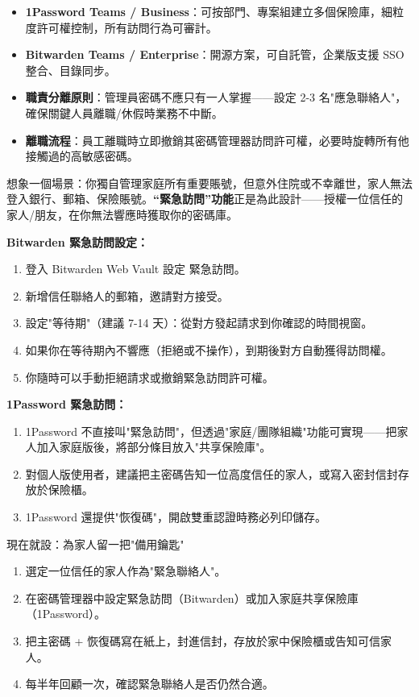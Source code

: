\begin{itemize}
  \item \textbf{1Password Teams / Business}：可按部門、專案組建立多個保險庫，細粒度許可權控制，所有訪問行為可審計。
  \item \textbf{Bitwarden Teams / Enterprise}：開源方案，可自託管，企業版支援 SSO 整合、目錄同步。
  \item \textbf{職責分離原則}：管理員密碼不應只有一人掌握——設定 2-3 名"應急聯絡人"，確保關鍵人員離職/休假時業務不中斷。
  \item \textbf{離職流程}：員工離職時立即撤銷其密碼管理器訪問許可權，必要時旋轉所有他接觸過的高敏感密碼。
\end{itemize}


想象一個場景：你獨自管理家庭所有重要賬號，但意外住院或不幸離世，家人無法登入銀行、郵箱、保險賬號。\textbf{“緊急訪問”功能}正是為此設計——授權一位信任的家人/朋友，在你無法響應時獲取你的密碼庫。

\textbf{Bitwarden 緊急訪問設定：}

\begin{enumerate}
  \item 登入 Bitwarden Web Vault 設定 緊急訪問。
  \item 新增信任聯絡人的郵箱，邀請對方接受。
  \item 設定"等待期"（建議 7-14 天）：從對方發起請求到你確認的時間視窗。
  \item 如果你在等待期內不響應（拒絕或不操作），到期後對方自動獲得訪問權。
  \item 你隨時可以手動拒絕請求或撤銷緊急訪問許可權。
\end{enumerate}

\textbf{1Password 緊急訪問：}

\begin{enumerate}
  \item 1Password 不直接叫"緊急訪問"，但透過"家庭/團隊組織"功能可實現——把家人加入家庭版後，將部分條目放入"共享保險庫"。
  \item 對個人版使用者，建議把主密碼告知一位高度信任的家人，或寫入密封信封存放於保險櫃。
  \item 1Password 還提供"恢復碼"，開啟雙重認證時務必列印儲存。
\end{enumerate}

\begin{tcbpractice}{現在就設：為家人留一把"備用鑰匙"}
\begin{enumerate}
  \item 選定一位信任的家人作為"緊急聯絡人"。
  \item 在密碼管理器中設定緊急訪問（Bitwarden）或加入家庭共享保險庫（1Password）。
  \item 把主密碼 + 恢復碼寫在紙上，封進信封，存放於家中保險櫃或告知可信家人。
  \item 每半年回顧一次，確認緊急聯絡人是否仍然合適。
\end{enumerate}

\end{tcbpractice}

